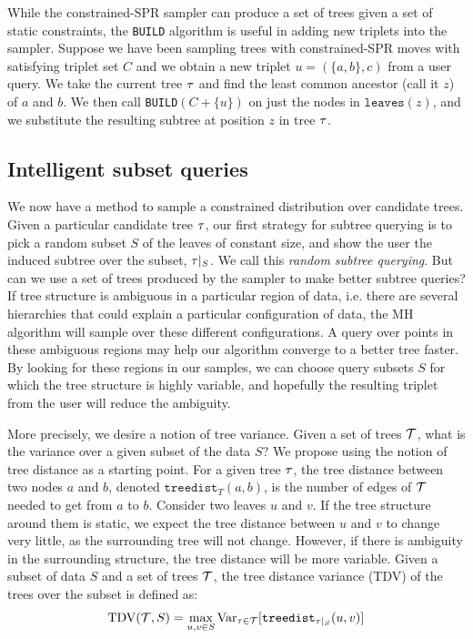 While the constrained-SPR sampler can produce
a set of trees given a set of static constraints,
the \texttt{BUILD} algorithm is useful in
adding new triplets into the sampler.
Suppose we have been sampling trees with constrained-SPR moves
with satisfying triplet set $C$ 
and we obtain a new triplet $u = (\{a, b\}, c)$ from a user query. 
We take the current tree $\tau$ and find the least common ancestor 
(call it $z$) of $a$ and $b$. We then call 
\texttt{BUILD}$(C + \{u\})$ on just the nodes in 
$\texttt{leaves}(z)$, and 
we substitute the resulting subtree at position $z$ in tree $\tau$.

\subsection{Intelligent subset queries}
We now have a method to sample a constrained
distribution over candidate trees.
Given a particular candidate tree $\tau$,
our first strategy for subtree querying
is to pick a random subset $S$ of the leaves
of constant size, and show the user
the induced subtree over the subset, $\tau|_S$.
We call this \emph{random subtree querying}.
But can we use a set of trees produced by the sampler
to make better subtree queries?
If tree structure is ambiguous in a particular region of data,
i.e. there are several hierarchies that could explain
a particular configuration of data, 
the MH algorithm will sample over
these different configurations. A query over points
in these ambiguous regions may help our algorithm
converge to a better tree faster. By looking for
these regions in our samples, we can choose query
subsets $S$ for which the tree structure is highly variable, 
and hopefully the resulting triplet from the user will 
reduce the ambiguity.

More precisely, we desire a notion of tree variance.
Given a set of trees $\mathcal{T}$, what is the variance
over a given subset of the data $S$?
We propose using the notion of tree distance
as a starting point. 
For a given tree $\tau$, the tree distance between two nodes $a$ and $b$,
denoted $\texttt{treedist}_T(a, b)$,
is the number of edges of $\mathcal{T}$ needed to get from $a$ to $b$.
Consider two leaves $u$ and $v$. If the tree structure around
them is static, we expect the tree distance
between $u$ and $v$ to change very little, as the surrounding tree
will not change. However, if there is
ambiguity in the surrounding structure, the tree distance will
be more variable.
Given a subset of data $S$ and a set of trees $\mathcal{T}$,
the tree distance variance (TDV) of the trees over the subset is defined as:
\begin{align}
    \text{TDV}(\mathcal{T}, S) = \max_{u, v \in S}\mathrm{Var}_{\tau \in \mathcal{T}}[\texttt{treedist}_{\tau|_S}(u, v)]
\end{align}

